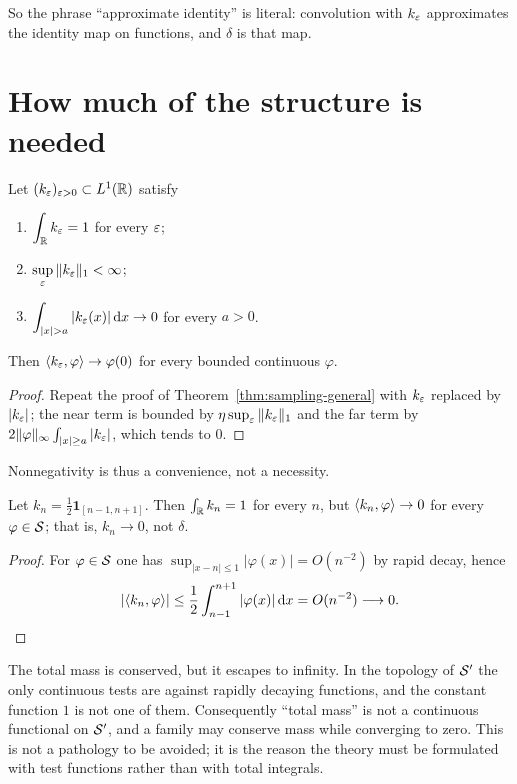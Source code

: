 So the phrase ``approximate identity'' is literal: convolution with $k_{\varepsilon}$ approximates the
identity map on functions, and $\delta$ is that map.

\section{How much of the structure is needed}

\begin{proposition}\label{prop:general-kernels}
Let $(k_{\varepsilon})_{\varepsilon>0}\subset L^{1}(\mathbb{R})$ satisfy
\begin{enumerate}
\item $\displaystyle\int_{\mathbb{R}}k_{\varepsilon}=1$ for every $\varepsilon$;
\item $\displaystyle\sup_{\varepsilon}\|k_{\varepsilon}\|_{1}<\infty$;
\item $\displaystyle\int_{|x|>a}|k_{\ep}(x)|\dd x\to0$ for every $a>0$.
\end{enumerate}
Then $\langle k_{\varepsilon},\varphi\rangle\to\varphi(0)$ for every bounded continuous $\varphi$.
\end{proposition}

\begin{proof}
Repeat the proof of Theorem~\ref{thm:sampling-general} with $k_{\varepsilon}$ replaced by $|k_{\varepsilon}|$; the
near term is bounded by $\eta\sup_{\varepsilon}\|k_{\varepsilon}\|_{1}$ and the far term by
$2\|\varphi\|_{\infty}\int_{|x|\ge a}|k_{\varepsilon}|$, which tends to $0$.
\end{proof}

Nonnegativity is thus a convenience, not a necessity.

\begin{proposition}\label{prop:escaping}
Let $k_{n}=\tfrac12\mathbf{1}_{[n-1,n+1]}$. Then $\int_{\mathbb{R}}k_{n}=1$ for every $n$, but
$\langle k_{n},\varphi\rangle\to0$ for every $\varphi\in\mathcal{S}$; that is, $k_{n}\to0$, not $\delta$.
\end{proposition}

\begin{proof}
For $\varphi\in\mathcal{S}$ one has $\sup_{|x-n|\le1}|\varphi(x)|=O(n^{-2})$ by rapid decay, hence
\begin{equation}
|\langle k_{n},\varphi\rangle|\le\frac{1}{2}\int_{n-1}^{n+1}|\varphi(x)|\,\mathrm{d} x=O(n^{-2})\longrightarrow0 .
\end{equation}
\end{proof}

\begin{remark}
The total mass is conserved, but it escapes to infinity. In the topology of $\mathcal{S}'$ the only
continuous tests are against rapidly decaying functions, and the constant function $1$ is not one of
them. Consequently ``total mass'' is not a continuous functional on $\mathcal{S}'$, and a family may conserve
mass while converging to zero. This is not a pathology to be avoided; it is the reason the theory
must be formulated with test functions rather than with total integrals.
\end{remark}

